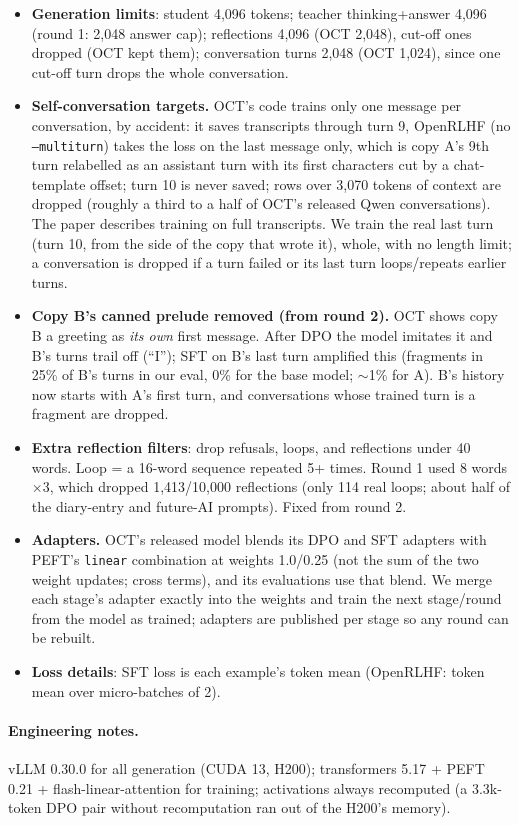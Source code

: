\begin{itemize}
        answered (never teaches compliance, only removes teacher-added refusals); drop looping teacher answers.
        The student is not asked when the teacher's answer already failed a filter (compute only).
  \item \textbf{Generation limits}: student 4,096 tokens; teacher thinking+answer 4,096 (round 1: 2,048 answer
        cap); reflections 4,096 (OCT 2,048), cut-off ones dropped (OCT kept them); conversation turns 2,048
        (OCT 1,024), since one cut-off turn drops the whole conversation.
  \item \textbf{Self-conversation targets.} OCT's code trains only one message per conversation, by accident:
        it saves transcripts through turn 9, OpenRLHF (no \texttt{--multiturn}) takes the loss on the last
        message only, which is copy A's 9th turn relabelled as an assistant turn with its first characters cut
        by a chat-template offset; turn 10 is never saved; rows over 3,070 tokens of context are dropped
        (roughly a third to a half of OCT's released Qwen conversations). The paper describes training on full
        transcripts. We train the real last turn (turn 10, from the side of the copy that wrote it), whole,
        with no length limit; a conversation is dropped if a turn failed or its last turn loops/repeats earlier turns.
  \item \textbf{Copy B's canned prelude removed (from round 2).} OCT shows copy B a greeting as \emph{its own}
        first message. After DPO the model imitates it and B's turns trail off (``I''); SFT on B's last turn amplified
        this (fragments in 25\% of B's turns in our eval, 0\% for the base model; $\sim$1\% for A). B's history now starts
        with A's first turn, and conversations whose trained turn is a fragment are dropped.
  \item \textbf{Extra reflection filters}: drop refusals, loops, and reflections under 40 words.
        Loop = a 16-word sequence repeated 5+ times. Round 1 used 8 words $\times$3, which dropped 1,413/10,000
        reflections (only 114 real loops; about half of the diary-entry and future-AI prompts). Fixed from round 2.
  \item \textbf{Adapters.} OCT's released model blends its DPO and SFT adapters with PEFT's \texttt{linear}
        combination at weights 1.0/0.25 (not the sum of the two weight updates; cross terms), and its
        evaluations use that blend. We merge each stage's adapter exactly into the weights and train the next
        stage/round from the model as trained; adapters are published per stage so any round can be rebuilt.
  \item \textbf{Loss details}: SFT loss is each example's token mean (OpenRLHF: token mean over micro-batches of 2).
\end{itemize}

\paragraph{Engineering notes.} vLLM 0.30.0 for all generation (CUDA 13, H200); transformers 5.17 + PEFT 0.21
+ flash-linear-attention for training; activations always recomputed (a 3.3k-token DPO pair without
recomputation ran out of the H200's memory).
